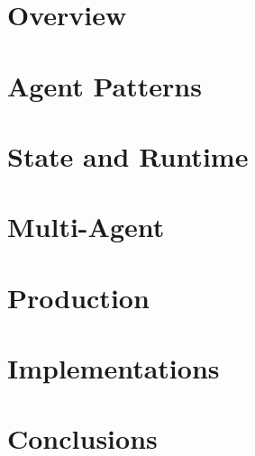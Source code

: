 \section[Overview]{Overview}


\section[Patterns]{Agent Patterns}


\section[State]{State and Runtime}


\section[Multi]{Multi-Agent}


\section[Prod]{Production}


\section[Impl]{Implementations}


\section[Concl]{Conclusions}


